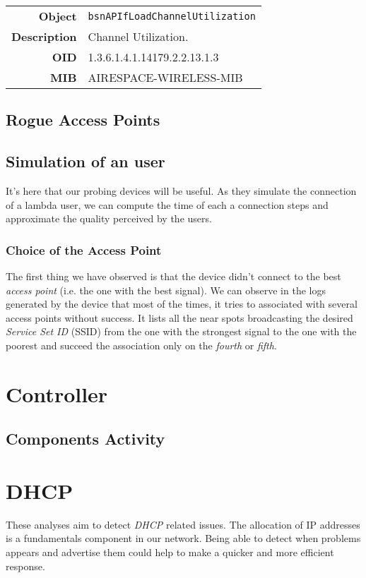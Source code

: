 \begin{tabular}{|r l|}
\hline
\textbf{Object} & \texttt{bsnAPIfLoadChannelUtilization} \\
\textbf{Description} & \parbox{11cm}{Channel Utilization.} \\
\textbf{OID} & 1.3.6.1.4.1.14179.2.2.13.1.3 \\
\textbf{MIB} & AIRESPACE-WIRELESS-MIB \\
\hline
\end{tabular}



\subsection{Rogue Access Points}

\subsection{Simulation of an user}
It's here that our probing devices will be useful. As they simulate the connection of a lambda user, we can compute the time of each a connection steps and approximate the quality perceived by the users.
\subsubsection*{Choice of the Access Point}
The first thing we have observed is that the device didn't connect to the best \emph{access point} (i.e. the one with the best signal). We can observe in the logs generated by the device that most of the times, it tries to associated with several access points without success. It lists all the near spots broadcasting the desired \emph{Service Set ID} (SSID) from the one with the strongest signal to the one with the poorest and succeed the association only on the \emph{fourth} or \emph{fifth}.

\section{Controller}

\subsection{Components Activity}

\section{DHCP}
These analyses aim to detect \emph{DHCP} related issues. The allocation  of IP addresses is a fundamentals component in our network. Being able to detect when problems appears and advertise them could help to make a quicker and more efficient response.

